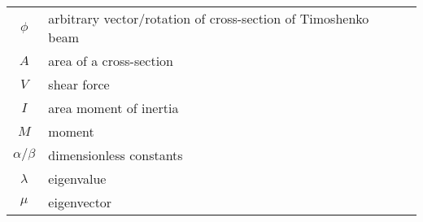 \documentclass[main.tex]{subfiles}
\begin{document}
\begin{tabularx}{\textwidth}{cXr}
\( \phi \) & arbitrary vector/rotation of cross-section of Timoshenko beam & \pageref{sym:phi} \\
\( A \) & area of a cross-section & \pageref{sym:A} \\
\( V \) & shear force & \pageref{sym:V} \\
\( I \) & area moment of inertia & \pageref{sym:Iinertia} \\
\( M \) & moment & \pageref{sym:M} \\
\( \alpha/\beta \) & dimensionless constants & \pageref{sym:alphabeta} \\
\( \lambda \) & eigenvalue & \pageref{sym:lambda} \\
\( \mu \) & eigenvector & \pageref{sym:mu} \\

\bottomrule
\end{tabularx}
\end{document}
